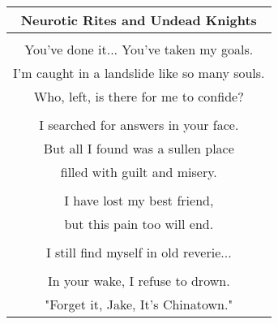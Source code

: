 \documentclass{article}
\begin{document}
\begin{center}
\begin{tabular}{c}
\textbf{Neurotic Rites and Undead Knights} \\ \hline
\\
You've done it... You've taken my goals. \\
I'm caught in a landslide like so many souls. \\
Who, left, is there for me to confide? \\
\\
I searched for answers in your face. \\
But all I found was a sullen place \\
filled with guilt and misery. \\
\\
I have lost my best friend, \\
but this pain too will end. \\
\\
I still find myself in old reverie... \\
\\
In your wake, I refuse to drown. \\
"Forget it, Jake, It's Chinatown." \\
\end{tabular}
\end{center}
\end{document}
